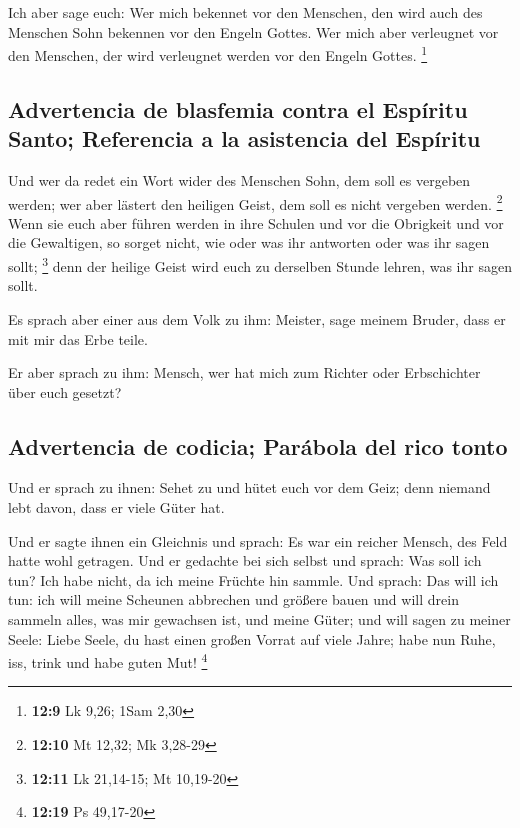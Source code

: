  Ich aber sage euch: Wer mich bekennet vor den Menschen,
den wird auch des Menschen Sohn bekennen vor den Engeln Gottes.
 Wer mich aber verleugnet vor den Menschen, der wird
verleugnet werden vor den Engeln Gottes. \footnote{\textbf{12:9} Lk
  9,26; 1Sam 2,30}

\hypertarget{advertencia-de-blasfemia-contra-el-espuxedritu-santo-referencia-a-la-asistencia-del-espuxedritu}{%
\subsection{Advertencia de blasfemia contra el Espíritu Santo;
Referencia a la asistencia del
Espíritu}\label{advertencia-de-blasfemia-contra-el-espuxedritu-santo-referencia-a-la-asistencia-del-espuxedritu}}

 Und wer da redet ein Wort wider des Menschen Sohn, dem
soll es vergeben werden; wer aber lästert den heiligen Geist, dem soll
es nicht vergeben werden. \footnote{\textbf{12:10} Mt 12,32; Mk 3,28-29}
 Wenn sie euch aber führen werden in ihre Schulen und vor
die Obrigkeit und vor die Gewaltigen, so sorget nicht, wie oder was ihr
antworten oder was ihr sagen sollt; \footnote{\textbf{12:11} Lk
  21,14-15; Mt 10,19-20}  denn der heilige Geist wird
euch zu derselben Stunde lehren, was ihr sagen sollt.

 Es sprach aber einer aus dem Volk zu ihm: Meister, sage
meinem Bruder, dass er mit mir das Erbe teile.

 Er aber sprach zu ihm: Mensch, wer hat mich zum Richter
oder Erbschichter über euch gesetzt?

\hypertarget{advertencia-de-codicia-paruxe1bola-del-rico-tonto}{%
\subsection{Advertencia de codicia; Parábola del rico
tonto}\label{advertencia-de-codicia-paruxe1bola-del-rico-tonto}}

 Und er sprach zu ihnen: Sehet zu und hütet euch vor dem
Geiz; denn niemand lebt davon, dass er viele Güter hat.

 Und er sagte ihnen ein Gleichnis und sprach: Es war ein
reicher Mensch, des Feld hatte wohl getragen.  Und er
gedachte bei sich selbst und sprach: Was soll ich tun? Ich habe nicht,
da ich meine Früchte hin sammle.  Und sprach: Das will
ich tun: ich will meine Scheunen abbrechen und größere bauen und will
drein sammeln alles, was mir gewachsen ist, und meine Güter;
 und will sagen zu meiner Seele: Liebe Seele, du hast
einen großen Vorrat auf viele Jahre; habe nun Ruhe, iss, trink und habe
guten Mut! \footnote{\textbf{12:19} Ps 49,17-20}

